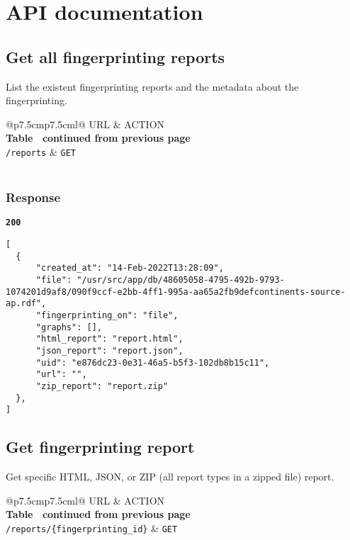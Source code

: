 \section{API documentation}

\subsection{Get all fingerprinting reports}
List the existent fingerprinting reports and the metadata about the fingerprinting.

\begin{longtable}[c]{@{}p{7.5cm}p{7.5cm}l@{}}
  \toprule
  URL                   & ACTION                              \\* \midrule
  \endfirsthead
  \multicolumn{3}{c}%
  {{\bfseries Table \thetable\ continued from previous page}} \\
  \endhead
  \bottomrule
  \endfoot
  \endlastfoot
  \texttt{/reports} & \texttt{GET}                        \\* \bottomrule
  \label{tab:rdf-fingerprinter-all-fingerprintings}                   \\
\end{longtable}

\subsubsection{Response}
\textbf{\texttt{200}}
\begin{lstlisting}
[
  {
      "created_at": "14-Feb-2022T13:28:09",
      "file": "/usr/src/app/db/48605058-4795-492b-9793-1074201d9af8/090f9ccf-e2bb-4ff1-995a-aa65a2fb9defcontinents-source-ap.rdf",
      "fingerprinting_on": "file",
      "graphs": [],
      "html_report": "report.html",
      "json_report": "report.json",
      "uid": "e876dc23-0e31-46a5-b5f3-102db8b15c11",
      "url": "",
      "zip_report": "report.zip"
  },
]
\end{lstlisting}

\subsection{Get fingerprinting report}
Get specific HTML, JSON, or ZIP (all report types in a zipped file) report.

\begin{longtable}[c]{@{}p{7.5cm}p{7.5cm}l@{}}
  \toprule
  URL                                      & ACTION           \\* \midrule
  \endfirsthead
  \multicolumn{3}{c}%
  {{\bfseries Table \thetable\ continued from previous page}} \\
  \endhead
  \bottomrule
  \endfoot
  \endlastfoot
  \texttt{/reports/\{fingerprinting\_id\}} & \texttt{GET}     \\* \bottomrule
  \label{tab:rdf-fingerprinter-get-fingerprinting-report}             \\
\end{longtable}

